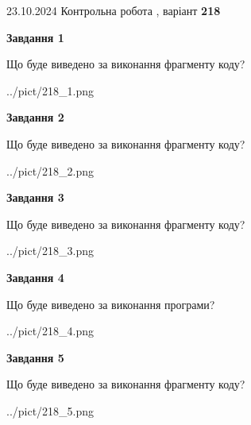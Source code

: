\documentclass[12pt, ukrainian]{article}
\begin{document}
{\Large{23.10.2024 Контрольна робота , варіант  \No \textbf { 218 }\par}}
{
\begin {large}
{\begin {center}\textbf{Завдання 1}\end {center}}

Що буде виведено за виконання фрагменту коду?\par
\begin{center}
	{../pict/218_1.png}
\end{center}
\newpage

{\begin {center}\textbf{Завдання 2}\end {center}}

Що буде виведено за виконання фрагменту коду?\par
\begin{center}
	{../pict/218_2.png}
\end{center}
\newpage

{\begin {center}\textbf{Завдання 3}\end {center}}

Що буде виведено за виконання фрагменту коду?\par
\begin{center}
	{../pict/218_3.png}
\end{center}
\newpage

{\begin {center}\textbf{Завдання 4}\end {center}}

Що буде виведено за виконання програми?\par
\begin{center}
	{../pict/218_4.png}
\end{center}
\newpage

{\begin {center}\textbf{Завдання 5}\end {center}}

Що буде виведено за виконання фрагменту коду?\par
\begin{center}
	{../pict/218_5.png}
\end{center}
\newpage


\end{large}}
\end{document}
